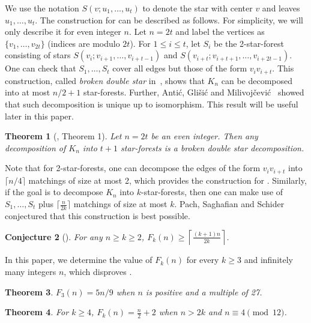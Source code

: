 \documentclass{article}
\newtheorem{thm}{Theorem}[section]
\newtheorem{conj}[thm]{Conjecture}
\renewcommand{\l}{\left}
\renewcommand{\r}{\right}
\begin{document}
We use the notation $S(v;u_1,\dots,u_t)$ to denote the star with center $v$ and leaves $u_1,\dots,u_t$. The construction for  can be described as follows. For simplicity, we will only describe it for even integer $n$. Let $n=2t$ and label the vertices as $\{v_1,\dots,v_{2t}\}$ (indices are modulo $2t$). For $1\le i\le t$, let $S_i$ be the 2-star-forest consisting of stars $S(v_i;v_{i+1},\dots,v_{i+t-1})$ and $S(v_{i+t};v_{i+t+1},\dots,v_{i+2t-1})$. One can check that $S_1,\dots,S_t$ cover all edges but those of the form $v_iv_{i+t}$. This construction, called {\em broken double star} in~\cite{antic2024star}, shows that $K_n$ can be decomposed into at most $n/2+1$ star-forests. Further, Anti{\'c}, Gli{\v{s}}i{\'c} and Milivoj{\v{c}}evi{\'c}~\cite{antic2024star} showed that such decomposition is unique up to isomorphism. This result will be useful later in this paper.

\begin{thm}[\cite{antic2024star}, Theorem 1]\label{thm:broken double star}
Let $n = 2t$ be an even integer. Then any decomposition of $K_n$ into
$t+1$ star-forests is a broken double star decomposition.
\end{thm}

Note that for 2-star-forests,  one can decompose the edges of the form $v_iv_{i+t}$ into $\lceil n/4 \rceil$ matchings of size at most 2, which provides the construction for . Similarly, if the goal is to decompose $K_n$ into $k$-star-forests, then one can make use of $S_1,\dots, S_t$ plus $\lceil \frac{n}{2k} \rceil$ matchings of size at most $k$. Pach, Saghafian and Schider conjectured that this construction is best possible.
\begin{conj}[\cite{pach2023decomposition}]\label{conj:star}
For any $n\ge k\ge 2$, $F_k(n)\ge \l\lceil\frac{(k+1)n}{2k} \r\rceil$.
\end{conj}

In this paper, we determine the value of $F_k(n)$ for every $k\ge 3$ and infinitely many integers $n$, which disproves .

\begin{thm}\label{thm:3-star}
$F_3(n)=5n/9$ when $n$ is positive and a multiple of 27.
\end{thm}

\begin{thm}\label{thm:4-star}
For $k\ge 4$, $F_k(n)=\frac{n}{2}+2$ when $n>2k$ and $n\equiv 4 \pmod{12}$.
\end{thm}
\end{document}
